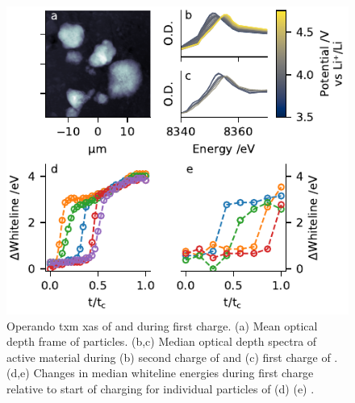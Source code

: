 \documentclass{article}
\begin{document}
\begin{figure}[!h]
  \includegraphics{figures/nmc_txm.pdf}
  \caption{Operando \gls{txm} \gls{xas} of \nmc[333]{} and \nmc[532]{}
    during first charge. (a) Mean optical depth frame of \nmc[333]{}
    particles. (b,c) Median optical depth spectra of active material
    during (b) second charge of \nmc[333]{} and (c) first charge of
    \nmc[532]{}. (d,e) Changes in median whiteline energies during
    first charge relative to start of charging for individual
    particles of (d) \nmc[333]{} (e) \nmc[532]{}.}
  \label{fig:txm-nmc}
\end{figure}
\end{document}
